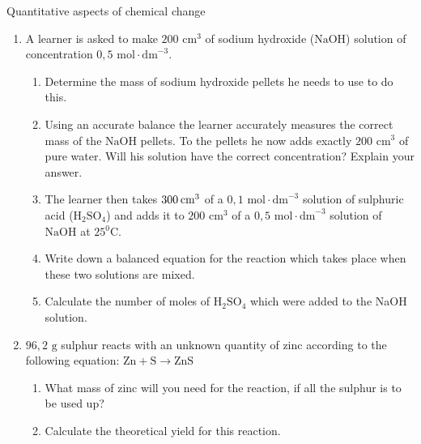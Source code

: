 \begin{eocexercises}{Quantitative aspects of chemical change}
\begin{enumerate}[noitemsep, label=\textbf{\arabic*}. ]
\begin{enumerate}[noitemsep, label=\textbf{\alph*}. ]
 \item Calculate the number of moles of sulphuric acid which were added to the sodium hydroxide solution.
 \item Is the number of moles of sulphuric acid enough to fully neutralise the sodium hydroxide solution? Support your answer by showing all relevant calculations.
 \end{enumerate}
\item A learner is asked to make $200 {\text{ cm}}^{3}$ of sodium hydroxide ($\text{NaOH}$) solution of concentration $0,5 \text{ mol} \cdot {\text{dm}}^{-3}$.
 \begin{enumerate}[noitemsep, label=\textbf{\alph*}. ] 
 \item Determine the mass of sodium hydroxide pellets he needs to use to do this.
 \item Using an accurate balance the learner accurately measures the correct mass of the $\text{NaOH}$ pellets. To the pellets he now adds exactly $200 {\text{ cm}}^{3}$ of pure water. Will his solution have the correct concentration? Explain your answer.
 \item The learner then takes $300\phantom{\rule{2pt}{0ex}}{\text{cm}}^{3}$ of a $0,1 \text{ mol} \cdot {\text{dm}}^{-3}$ solution of sulphuric acid ($\text{H}{}_{2}\text{SO}{}_{4}$) and adds it to $200 {\text{ cm}}^{3}$ of a $0,5 \text{ mol} \cdot {\text{dm}}^{-3}$ solution of $\text{NaOH}$ at $25{}^{0}\text{C}$.
 \item Write down a balanced equation for the reaction which takes place when these two solutions are mixed.
 \item Calculate the number of moles of $\text{H}{}_{2}\text{SO}{}_{4}$ which were added to the NaOH solution.
\end{enumerate}
\item $96,2 \text{ g}$ sulphur reacts with an unknown quantity of zinc according to the following equation:
$\text{Zn}+\text{S}\to \text{ZnS}$
 \begin{enumerate}[noitemsep, label=\textbf{\alph*}. ] 
 \item What mass of zinc will you need for the reaction, if all the sulphur is to be used up?
 \item Calculate the theoretical yield for this reaction.

\end{enumerate}
\end{enumerate}
\end{eocexercises}

